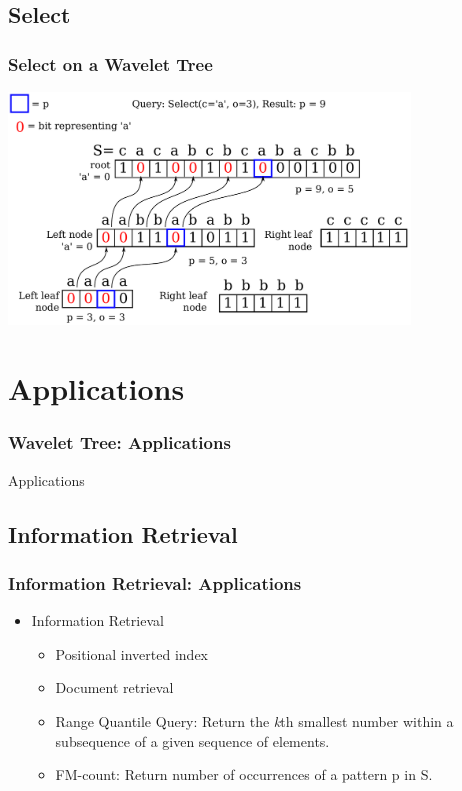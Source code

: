 \documentclass{beamer}
\begin{document}

\subsection{Select}
\begin{frame}
\frametitle{Select on a Wavelet Tree}
\begin{center}
	\includegraphics[width=0.8\textwidth]{SelectDrawing}
\end{center}
\end{frame}

\section{Applications}
\begin{frame}
\frametitle{Wavelet Tree: Applications}
\begin{center} \Huge{Applications} \end{center}
\end{frame}

\subsection{Information Retrieval}
\begin{frame}
\frametitle{Information Retrieval: Applications}
\begin{itemize}
\item Information Retrieval
	\begin{itemize}
	\item Positional inverted index
	\item Document retrieval
	\item Range Quantile Query: Return the \textit{k}th smallest number within a subsequence of a given sequence of elements.
	\item FM-count: Return number of occurrences of a pattern p in S. 
	\end{itemize}
\end{itemize}
\end{frame}
\end{document}
